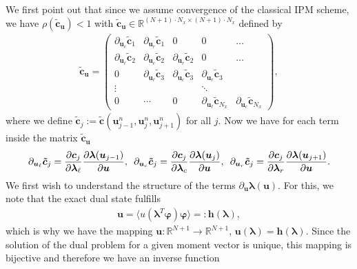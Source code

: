 \documentclass[10pt, a4paper, titlepage, bibliography=totocnumbered]{article}
\newenvironment{proof}[1][Proof]{\begin{trivlist}
\item[\hskip \labelsep {\bfseries #1}]}{\end{trivlist}}
\begin{document}
\begin{proof}
We first point out that since we assume convergence of the classical IPM scheme, we have $\rho (\bm{\tilde c}_{\bm{u}})<1$ with $\bm{\tilde c}_{\bm{u}}\in\mathbb{R}^{(N+1)\cdot N_x\times (N+1)\cdot N_x}$ defined by
\begin{align*}
\bm{\tilde c}_{\bm{u}} = 
\begin{pmatrix} 
    \partial_{\bm{u}_c}\bm{\tilde c}_{1} & \partial_{\bm{u}_r}\bm{\tilde c}_{1}& 0 & 0 & \dots \\
    \partial_{\bm{u}_{\ell}}\bm{\tilde c}_{2} & \partial_{\bm{u}_c}\bm{\tilde c}_{2} & \partial_{\bm{u}_r}\bm{\tilde c}_{2}& 0 & \dots \\
    0 & \partial_{\bm{u}_{\ell}}\bm{\tilde c}_{3} & \partial_{\bm{u}_c}\bm{\tilde c}_{3} & \partial_{\bm{u}_r}\bm{\tilde c}_{3}\\
    \vdots & & & \ddots & \\
    0 &\cdots &  0 & \partial_{\bm{u}_{\ell}}\bm{\tilde c}_{N_x} & \partial_{\bm{u}_c}\bm{\tilde c}_{N_x}
    \end{pmatrix},
\end{align*}
where we define $\bm{\tilde c}_{j}:=\bm{\tilde c}\left(\bm{u}_{j-1}^n,\bm{u}_{j}^n,\bm{u}_{j+1}^n\right)$ for all $j$. Now we have for each term inside the matrix $\bm{\tilde c}_{\bm{u}}$
\begin{align}\label{eq:cTildeDer}
\partial_{\bm{u}_{\ell}}\bm{\tilde c}_{j} = \frac{\partial \bm{c}_j}{\partial \bm{\lambda}_{\ell}}\frac{\partial \bm{\lambda}(\bm{u}_{j-1})}{\partial \bm{u}},\enskip\partial_{\bm{u}_c}\bm{\tilde c}_{j} = \frac{\partial \bm{c}_j}{\partial \bm{\lambda}_c}\frac{\partial \bm{\lambda}(\bm{u}_j)}{\partial \bm{u}},\enskip\partial_{\bm{u}_r}\bm{\tilde c}_{j} = \frac{\partial \bm{c}_j}{\partial \bm{\lambda}_r}\frac{\partial \bm{\lambda}(\bm{u}_{j+1})}{\partial \bm{u}}.
\end{align}
We first wish to understand the structure of the terms $\partial_{\bm{u}} \bm{\lambda}(\bm{u})$. For this, we note that the exact dual state fulfills
\begin{align}\label{eq:ulambda}
\bm{u} = \langle u(\bm{\lambda}^T\bm{\varphi})\bm{\varphi}\rangle =: \bm{h}(\bm{\lambda}),
\end{align}
which is why we have the mapping $\bm{u}:\mathbb{R}^{N+1}\to\mathbb{R}^{N+1}$, $\bm{u}(\bm{\lambda}) = \bm{h}(\bm{\lambda})$. Since the solution of the dual problem for a given moment vector is unique, this mapping is bijective and therefore we have an inverse function
\begin{align}\label{eq:lambdau}

\end{align}
\end{proof}
\end{document}
